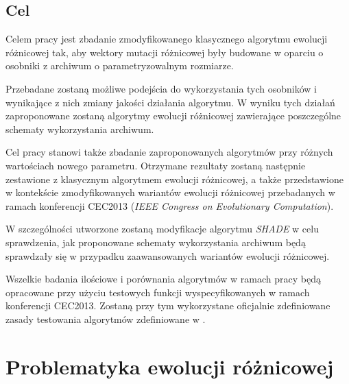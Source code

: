 \documentclass[12pt,a4paper]{report}
\begin{document}
{\section{Cel}
\par{
Celem pracy jest zbadanie zmodyfikowanego klasycznego algorytmu ewolucji różnicowej tak, aby wektory mutacji różnicowej były budowane w oparciu o osobniki z archiwum o parametryzowalnym rozmiarze.
}
\par{
Przebadane zostaną możliwe podejścia do wykorzystania tych osobników i wynikające z nich zmiany jakości działania algorytmu. W wyniku tych działań zaproponowane zostaną algorytmy ewolucji różnicowej zawierające poszczególne schematy wykorzystania archiwum.
}
\par{
Cel pracy stanowi także zbadanie zaproponowanych algorytmów przy różnych wartościach nowego parametru. Otrzymane rezultaty zostaną następnie zestawione z klasycznym algorytmem ewolucji różnicowej, a także przedstawione w kontekście zmodyfikowanych wariantów ewolucji różnicowej przebadanych w ramach konferencji CEC2013 (\emph{IEEE Congress on Evolutionary Computation}).
}
\par{
W szczególności utworzone zostaną modyfikacje algorytmu \emph{SHADE} \cite{SHADE} w celu sprawdzenia, jak proponowane schematy wykorzystania archiwum będą sprawdzały się w przypadku zaawansowanych wariantów ewolucji różnicowej.
}
\par{
Wszelkie badania ilościowe i porównania algorytmów w ramach pracy będą opracowane przy użyciu testowych funkcji wyspecyfikowanych w ramach konferencji CEC2013. Zostaną przy tym wykorzystane oficjalnie zdefiniowane zasady testowania algorytmów zdefiniowane w \cite{Li13benchmarkfunctions}.
}




\chapter{Problematyka ewolucji różnicowej}
}
\end{document}
